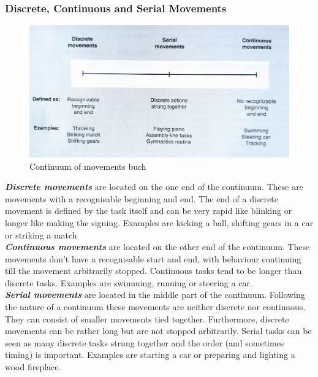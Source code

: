 \subsubsection{Discrete, Continuous and Serial Movements}
\begin{figure}
	\centering
	\includegraphics[width=1.0\textwidth]{img/movements_cont.jpg}
	\caption{Continuum of movements buch \cite{Schmidt2011}}
	\label{fig:movements_cont}
\end{figure}
\textit{\textbf{Discrete movements}} are located on the one end of the continuum. These are movements with a recognisable beginning and end. The end of a discrete movement is defined by the task itself and can be very rapid like blinking or longer like making the signing. Examples are kicking a ball, shifting gears in a car or striking a match\\
\textit{\textbf{Continuous movements}} are located on the other end of the continuum. These movements don't have a recognisable start and end, with behaviour continuing till the movement arbitrarily stopped. Continuous tasks tend to be longer than discrete tasks. Examples are swimming, running or steering a car.\\
\textit{\textbf{Serial movements}} are located in the middle part of the continuum. Following the nature of a continuum these movements are neither discrete nor continuous. They can consist of smaller movements tied together. Furthermore, discrete movements can be rather long but are not stopped arbitrarily. Serial tasks can be seen as many discrete tasks strung together and the order (and sometimes timing) is important. Examples are starting a car or preparing and lighting a wood fireplace.

